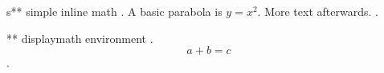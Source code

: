 s** simple inline math
.
A basic parabola is $y = x^2$. More text afterwards.
.

** displaymath environment
.
\begin{displaymath}
a + b = c
\end{displaymath}
.
